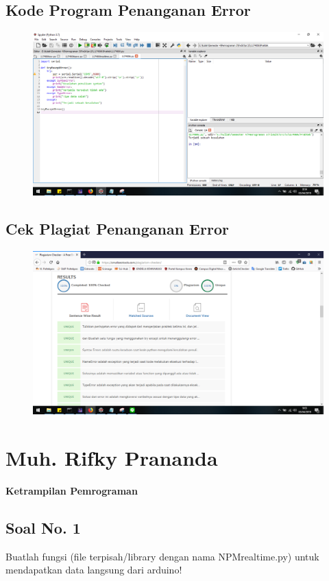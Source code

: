 \subsection{Kode Program Penanganan Error}
\begin{figure}[H]
	\includegraphics[width=12cm]{figures/5/1174006/Praktek/error.png}
	\centering
\end{figure}

\subsection{Cek Plagiat Penanganan Error}
\begin{figure}[H]
	\includegraphics[width=12cm]{figures/5/1174006/Praktek/plagiaterror.png}
	\centering
\end{figure}


\section{Muh. Rifky Prananda}
{\Large \textbf{Ketrampilan Pemrograman}}
\subsection{Soal No. 1}
Buatlah  fungsi  (file  terpisah/library  dengan  nama  NPMrealtime.py)  untuk mendapatkan data langsung dari arduino!


